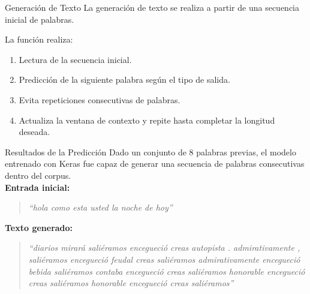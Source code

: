 \documentclass{beamer}
\begin{document}
\begin{frame}[fragile]{Generación de Texto}
	\small
	La generación de texto se realiza a partir de una secuencia inicial de palabras.
	
	\vspace{0.5em}
	
	
	\vspace{0.5em}
	La función realiza:
	\begin{enumerate}
		\item Lectura de la secuencia inicial.
		\item Predicción de la siguiente palabra según el tipo de salida.
		\item Evita repeticiones consecutivas de palabras.
		\item Actualiza la ventana de contexto y repite hasta completar la longitud deseada.
	\end{enumerate}
\end{frame}


\begin{frame}{Resultados de la Predicción}
	\small
	Dado un conjunto de 8 palabras previas, el modelo entrenado con Keras fue capaz de generar una secuencia de palabras consecutivas dentro del corpus.\\[0.5em]
	
	\textbf{Entrada inicial:}
	\begin{quote}
		\textit{``hola como esta usted la noche de hoy''}
	\end{quote}
	
	\textbf{Texto generado:}
	\begin{quote}
		\textit{``diarios mirará saliéramos encegueció creas autopista . admirativamente , saliéramos encegueció feudal creas saliéramos admirativamente encegueció bebida saliéramos contaba encegueció creas saliéramos honorable encegueció creas saliéramos honorable encegueció creas saliéramos''}
	\end{quote}
\end{frame}	
\end{document}
